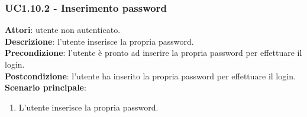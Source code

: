 	\subsubsection{UC1.10.2 - Inserimento password}{
		\label{uc1.10.2}
		\textbf{Attori}: utente non autenticato. \\
		\textbf{Descrizione}: l'utente  inserisce la propria password.	\\
		\textbf{Precondizione}: l'utente  è pronto ad inserire la propria password per effettuare il login.	\\
		\textbf{Postcondizione}: l'utente  ha inserito la propria password per effettuare il login.	\\
		\textbf{Scenario principale}:
		\begin{enumerate}
			\item L'utente inserisce la propria password.
		\end{enumerate}
		}
